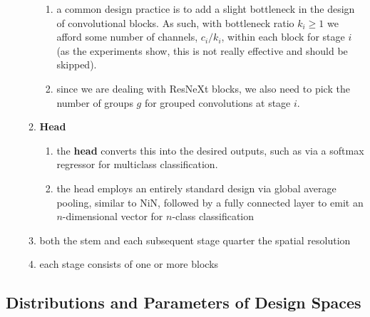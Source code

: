 \begin{enumerate}
\begin{enumerate}
\begin{enumerate}
            \item a common design practice is to add a slight bottleneck in the design of convolutional blocks. As such, with bottleneck ratio $k_i \geq 1$ we afford some number of channels, $c_i/k_i$, within each block for stage $i$ (as the experiments show, this is not really effective and should be skipped).

            \item since we are dealing with ResNeXt blocks, we also need to pick the number of groups $g$ for grouped convolutions at stage $i$.

        \end{enumerate}

        \item \textbf{Head}
        \begin{enumerate}
            \item the \textbf{head} converts this into the desired outputs, such as via a softmax regressor for multiclass classification.

            \item the head employs an entirely standard design via global average pooling, similar to NiN, followed by a fully connected layer to emit an  $n$-dimensional vector for $n$-class classification

        \end{enumerate}

        \item both the stem and each subsequent stage quarter the spatial resolution

        \item each stage consists of one or more blocks

    \end{enumerate}
\end{enumerate}

\subsection{Distributions and Parameters of Design Spaces}

